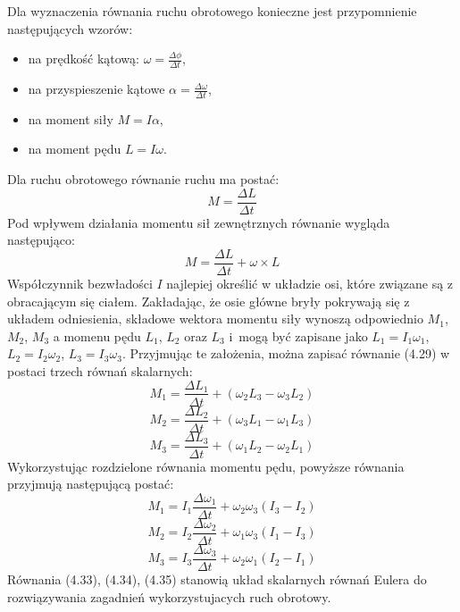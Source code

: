 Dla wyznaczenia równania ruchu obrotowego konieczne jest przypomnienie następujących wzorów:
\begin{itemize}
\item na prędkość kątową: $\omega=\frac{\Delta\phi}{\Delta t}$,
\item na przyspieszenie kątowe $\alpha=\frac{\Delta\omega}{\Delta t}$,
\item na moment siły $M = I\alpha$,
\item na moment pędu $L = I\omega$.
\end{itemize}
Dla ruchu obrotowego równanie ruchu ma postać:
\begin{equation}M=\frac{\Delta L}{\Delta t}\end{equation}
Pod wpływem działania momentu sił zewnętrznych równanie wygląda następująco:
\begin{equation}M=\frac{\Delta L}{\Delta t}+\omega\times L\end{equation}
Współczynnik bezwładości $I$ najlepiej określić w układzie osi, które związane są z obracającym się ciałem. Zakładając, że osie główne bryły pokrywają się z układem odniesienia, składowe wektora momentu siły wynoszą odpowiednio $M_1$, $M_2$, $M_3$ a momenu pędu $L_1$, $L_2$ oraz $L_3$ i~mogą być zapisane jako $L_1 = I_1\omega_1$, $L_2 = I_2\omega_2$, $L_3 = I_3\omega_3$.
Przyjmując te założenia, można zapisać równanie (4.29) w postaci trzech równań skalarnych:
\begin{equation}M_1=\frac{\Delta L_1}{\Delta t}+(\omega_2L_3 - \omega_3L_2)\end{equation}
\begin{equation}M_2=\frac{\Delta L_2}{\Delta t}+(\omega_3L_1 - \omega_1L_3)\end{equation}
\begin{equation}M_3=\frac{\Delta L_3}{\Delta t}+(\omega_1L_2 - \omega_2L_1)\end{equation}
Wykorzystując rozdzielone równania momentu pędu, powyższe równania przyjmują następującą postać:
\begin{equation}M_1=I_1\frac{\Delta\omega_1}{\Delta t}+\omega_2\omega_3(I_3 - I_2)\end{equation}
\begin{equation}M_2=I_2\frac{\Delta\omega_2}{\Delta t}+\omega_1\omega_3(I_1 - I_3)\end{equation}
\begin{equation}M_3=I_3\frac{\Delta\omega_3}{\Delta t}+\omega_2\omega_1(I_2 - I_1)\end{equation}
Równania (4.33), (4.34), (4.35) stanowią układ skalarnych równań Eulera do rozwiązywania zagadnień wykorzystujacych ruch obrotowy.